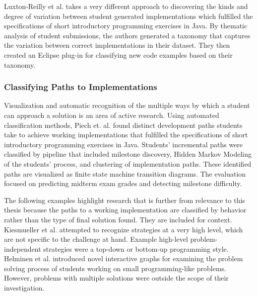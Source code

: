 \documentclass[12pt]{article}
\begin{document}
Luxton-Reilly et al. \cite{Luxton13} takes a very different approach to discovering the kinds and degree of variation between student generated implementations which fulfilled the specifications of short introductory programming exercises in Java . By thematic analysis \cite{thematic06} of student submissions, the authors generated a taxonomy that captures the variation between correct implementations in their dataset. They then created an Eclipse plug-in for classifying new code examples based on their taxonomy. 


%
%

\subsubsection{Classifying Paths to Implementations}

Visualization and automatic recognition of the multiple ways by which a student can approach a solution is an area of active research. Using automated classification methods, Piech et. al. \cite{Piech} found distinct development paths students take to achieve working implementations that fulfilled the specifications of short introductory programming exercises in Java. Students' incremental paths were classified by pipeline that included milestone discovery, Hidden Markov Modeling of the students' process, and clustering of implementation paths. These identified paths are visualized as finite state machine transition diagrams. The evaluation focused on predicting midterm exam grades and detecting milestone difficulty.

The following examples highlight research that is further from relevance to this thesis because the paths to a working implementation are classified by behavior rather than the type of final solution found. They are included for context. Kiesmueller et al. \cite{Kiesmueller} attempted to recognize strategies at a very high level, which are not specific to the challenge at hand. Example high-level problem-independent strategies were a top-down or bottom-up programming style. Helminen et al. \cite{ICERHelminen} introduced novel interactive graphs for examining the problem solving process of students working on small programming-like problems. However, problems with multiple solutions were outside the scope of their investigation.
\end{document}

